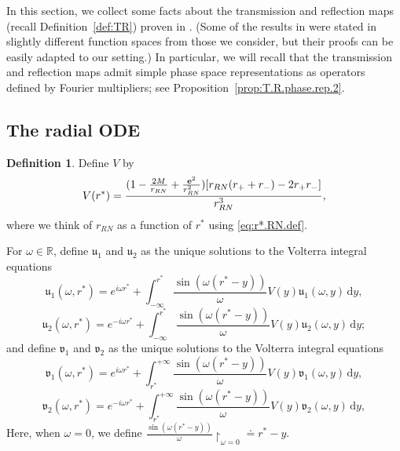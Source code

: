 \documentclass[10pt, reqno]{amsart}
\theoremstyle{definition}
\newtheorem{definition}[theorem]{Definition}
\theoremstyle{remark}
\numberwithin{equation}{section}
\newcommand{\ud}{\mathrm{d}}
\newcommand{\0}{\emptyset}
\newcommand{\om}{\omega}
\newcommand{\f}{\frac}
\begin{document}
In this section, we collect some facts about the transmission and reflection maps (recall Definition~\ref{def:TR}) proven in \cite{KSR}. (Some of the results in \cite{KSR} were stated in slightly different function spaces from those we consider, but their proofs can be easily adapted to our setting.) In particular, we will recall that the transmission and reflection maps admit simple phase space representations as operators defined by Fourier multipliers; see Proposition~\ref{prop:T.R.phase.rep.2}. %

\subsection{The radial ODE}

\begin{definition}
Define $V$ by 
\begin{equation}\label{eq:def.V}
V(r^*) =  \f{(1-\f{2M}{r_{RN}} + \f{{\bf e}^2}{r_{RN}^2}) [ r_{RN}(r_+ + r_-) - 2r_+ r_-]}{r_{RN}^3},
\end{equation}
where we think of $r_{RN}$ as a function of $r^*$ using \eqref{eq:r*.RN.def}.

For $\om \in \mathbb R$, define $\mathfrak u_1$ and $\mathfrak u_2$ as the unique solutions to the Volterra integral equations
\begin{equation}\label{eq:def.u1}
\mathfrak u_1(\om,r^*) = e^{i\om r^*} + \int_{-\infty}^{r^*} \f{\sin(\om(r^*-y))}{\om} V(y) \mathfrak u_1(\om,y)\, \ud y,
\end{equation}
\begin{equation}\label{eq:def.u2}
\mathfrak u_2(\om,r^*) = e^{-i\om r^*} + \int_{-\infty}^{r^*} \f{\sin(\om(r^*-y))}{\om} V(y) \mathfrak u_2(\om,y)\, \ud y;
\end{equation}
and define $\mathfrak v_1$ and $\mathfrak v_2$ as the unique solutions to the Volterra integral equations
\begin{equation}\label{eq:def.v1}
\mathfrak v_1(\om,r^*) = e^{i\om r^*} + \int_{r^*}^{+\infty} \f{\sin(\om(r^*-y))}{\om} V(y) \mathfrak v_1(\om,y)\, \ud y,
\end{equation}
\begin{equation}\label{eq:def.v2}
\mathfrak v_2(\om,r^*) = e^{-i\om r^*} + \int_{r^*}^{+\infty} \f{\sin(\om(r^*-y))}{\om} V(y) \mathfrak v_2(\om,y)\, \ud y,
\end{equation}
Here, when $\om = 0$, we define $\f{\sin(\om(r^*-y))}{\om}\restriction_{\om = 0} \doteq r^* - y$.
\end{definition}
\end{document}

